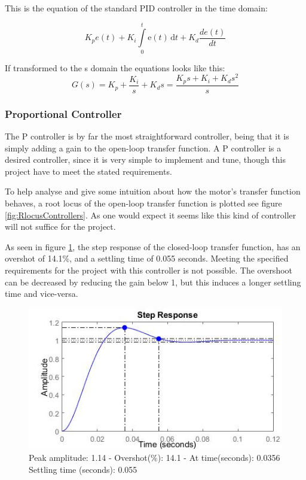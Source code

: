 This is the equation of the standard PID controller in the time domain:

\begin{equation}
K_{p}e(t)+K_{i} \int\limits_0^t \mathrm{e}(t)\,\mathrm{d}t+K_{d}\frac{de(t)}{dt}
\end{equation}

If transformed to the s domain the equations looks like this:\\

\begin{equation}G(s)=K_{p}+\frac{K_{i}}{s}+K_{d}s=\frac{K_{p}s+K_i+K_{d}s^2}{s}
\label{Eq_2}
\end{equation}

\subsubsection{Proportional Controller}

The P controller is by far the most straightforward controller, being that it is simply adding a gain to the open-loop transfer function. A P controller is a desired controller, since it is very simple to implement and tune, though this project have to meet the stated requirements.\par

To help analyse and give some intuition about how the motor’s transfer function behaves, a root locus of the open-loop transfer function is plotted see figure \ref{fig:RlocusControllers}. As one would expect it seems like this kind of controller will not suffice for the project.\par

As seen in figure \ref{fig:PStep}, the step response of the closed-loop transfer function, has an overshot of 14.1\%, and a settling time of 0.055 seconds. Meeting the specified requirements for the project with this controller is not possible. The overshoot can be decreased by reducing the gain below 1, but this induces a longer settling time and vice-versa. 

\begin{figure}[h!]
\centering
\includegraphics[scale=0.7]{Billeder/PStep.jpg}
\caption{ Peak amplitude: 1.14 - Overshot(\%): 14.1 - At time(seconds): 0.0356
		 Settling time (seconds): 0.055 }
\label{fig:PStep}
\end{figure}


